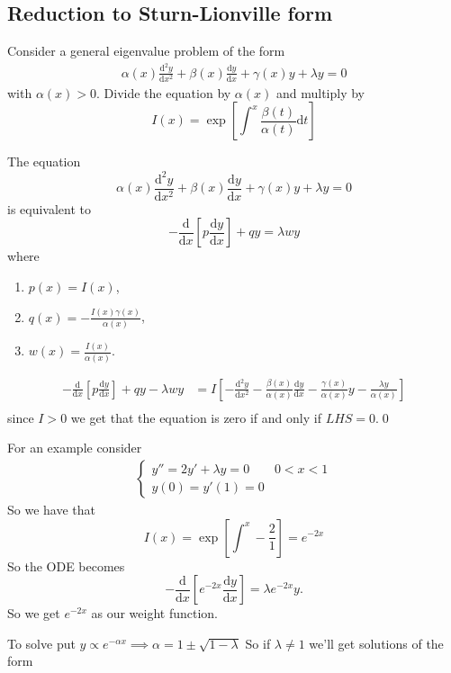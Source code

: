 \documentclass{article}
\begin{document}
\subsection{Reduction to Sturn-Lionville form}
Consider a general eigenvalue problem of the form
\begin{align*}
	\alpha(x)\frac{\mathrm d^2y}{\mathrm dx^2}+\beta(x)\frac{\mathrm dy}{\mathrm dx}+\gamma(x)y+\lambda y=0
\end{align*}
with $ \alpha(x)>0 $. Divide the equation by $ \alpha(x) $ and multiply by
\[
	I(x)=\exp\left[\int^x\frac{\beta(t)}{\alpha(t)}\mathrm dt\right]
\]
\begin{proposition}
  The equation
  \[
    \alpha(x)\frac{\mathrm d^2y}{\mathrm dx^2}+\beta(x)\frac{\mathrm dy}{\mathrm dx}+\gamma(x)y+\lambda y=0
  \]
  is equivalent to
  \[
	  -\frac{\mathrm d}{\mathrm dx}\left[p\frac{\mathrm dy}{\mathrm dx}\right] + qy=\lambda wy
  \]
  where
  \begin{enumerate}
	  \item $ p(x)=I(x) $,
	  \item $ q(x)=-\frac{I(x)\gamma(x)}{\alpha(x)} $,
	  \item $ w(x)=\frac{I(x)}{\alpha(x)} $.
  \end{enumerate}
\end{proposition}
\pf 
\begin{align*}
  -\frac{\mathrm d}{\mathrm dx}\left[p\frac{\mathrm dy}{\mathrm dx}\right] + qy-\lambda wy &= I\left[-\frac{\mathrm d^2y}{\mathrm dx^2}-\frac{\beta(x)}{\alpha(x)}\frac{\mathrm dy}{\mathrm dx}-\frac{\gamma(x)}{\alpha(x)}y-\frac{\lambda y}{\alpha(x)}\right]\\
\end{align*}
since $ I>0 $ we get that the equation is zero if and only if $ LHS=0 $.\qed\par
For an example consider
\begin{align*}
  \begin{cases}
	  y''=2y'+\lambda y= 0 & 0<x<1\\
	  y(0)=y'(1)=0
  \end{cases}
\end{align*}
So we have that 
\[
	I(x)=\exp\left[\int^x -\frac 21\right]=e^{-2x}
\]
So the ODE becomes
\[
	-\frac{\mathrm d}{\mathrm dx}\left[e^{-2x}\frac{\mathrm dy}{\mathrm dx}\right]=\lambda e^{-2x}y.
\]
So we get $ e^{-2x} $ as our weight function.\par
To solve put $ y\propto e^{-\alpha x} \implies \alpha=1\pm\sqrt{1-\lambda} $ So if $ \lambda \ne 1 $ we'll get solutions of the form
\end{document}
